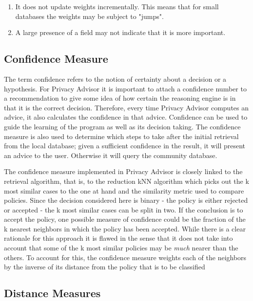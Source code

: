 \begin{enumerate}
\item It does not update weights incrementally. This means that for small databases the weights may be subject to "jumps".
\item A large presence of a field may not indicate that it is more important.
\end{enumerate}


\subsection{Confidence Measure}\label{confidenceMeasure}
The term confidence refers to the notion of certainty about a decision or a hypothesis. For Privacy Advisor it is important to attach a confidence number to a recommendation to give some idea of how certain the reasoning engine is in that it is the correct decision. Therefore, every time Privacy Advisor computes an advice, it also calculates the confidence in that advice. Confidence can be used to guide the learning of the program as well as its decision taking. The confidence measure is also used to determine which steps to take after the initial retrieval from the local database; given a sufficient confidence in the result, it will present an advice to the user. Otherwise it will query the community database.

The confidence measure implemented in Privacy Advisor is closely linked to the retrieval algorithm, that is, to the reduction kNN algorithm which picks out the k most similar cases to the one at hand and the similarity metric used to compare policies. Since the decision considered here is binary - the policy is either rejected or accepted - the k most similar cases can be split in two. If the conclusion is to accept the policy, one possible measure of confidence could be the fraction of the k nearest neighbors in which the policy has been accepted. While there is a clear rationale for this approach it is flawed in the sense that it does not take into account that some of the k most similar policies may be \emph{much} nearer than the others. To account for this, the confidence measure weights each of the neighbors by the inverse of its distance from the policy that is to be classified


\subsection{Distance Measures}\label{SimilarityMeasures} 

